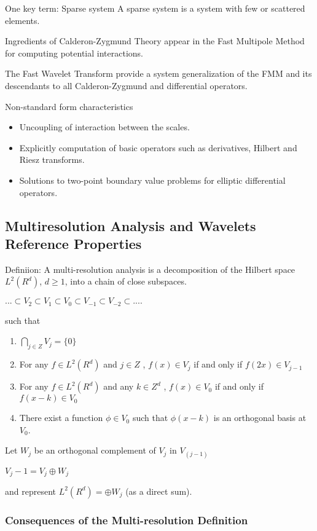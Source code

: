 \documentclass[11pt]{article}
\begin{document}
One key term: Sparse system
A sparse system is a system with few or scattered elements.  

Ingredients of Calderon-Zygmund Theory appear in the Fast Multipole Method for computing potential interactions.  

The Fast Wavelet Transform provide a system generalization of the FMM and its descendants to all Calderon-Zygmund and differential operators.

Non-standard form characteristics 
\begin{itemize}
\item Uncoupling of interaction between the scales.
\item Explicitly computation of basic operators such as derivatives, Hilbert and Riesz transforms.  
\item Solutions to two-point boundary value problems for elliptic differential operators.
\end{itemize}

\subsection {Multiresolution Analysis and Wavelets Reference Properties}
Definiion:  A multi-resolution analysis is a decomposition of the Hilbert space $L^2(R^d)$,  $d\ge 1$, into a chain of close subspaces.

$...\subset V_2 \subset V_1 \subset V_0 \subset V_{-1} \subset V_{-2} \subset ....$

such that
\begin{enumerate}
\item $\bigcap _{j\in Z} V_j = \{0\} $
\item For any $f\in L^2 (R^d)$  and $j\in Z$ , $f(x)\in V_j$ if and only if $f(2x)\in V_{j-1}$
\item For any $ f\in L^2 (R^d)$ and any $k\in Z^d$ , $f(x)\in V_0$ if and only if $f(x-k)\in V_0$ 
\item There exist a function $ \phi \in V_0$ such that $\phi (x-k)$ is an orthogonal basis at $V_0$.
\end{enumerate}

Let $W_j$ be an orthogonal complement of $V_j$ in $V_(j-1)$ 

$V_j-1 =V_j \oplus W_j$

and represent $ L^2(R^d)= \oplus W_j $ (as a direct sum). 


\subsubsection {Consequences of the Multi-resolution Definition}
\end{document}
